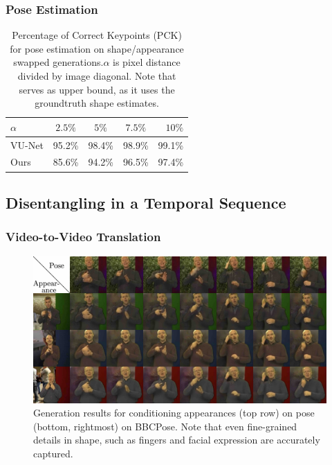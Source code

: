 		\begin{frame}[t]
		\frametitle{Pose Estimation}
			\begin{table}[htp]
				\centering
				\caption{Percentage of Correct Keypoints (PCK) for pose estimation on shape/appearance swapped generations.\;$\alpha$ is pixel distance divided by image diagonal. Note that \cite{esser18} serves as upper bound, as it uses the groundtruth shape estimates.}
				\label{tab:pose}
				\begin{tabular}{l|cccr}
					\hline
					$\alpha$ & $2.5\%$ &  $5\%$ & $7.5\%$ & $10\%$ \\ \hline
					VU-Net \cite{esser18} & {95.2}\% & {98.4}\% & {98.9}\% & {99.1}\% \\
					Ours & 85.6\% & 94.2\% &96.5\% & 97.4\% \\ \hline
				\end{tabular}
			\end{table}
		\end{frame}


	\subsection{Disentangling in a Temporal Sequence}
		\begin{frame}[t]
		\frametitle{Video-to-Video Translation}
			\begin{figure}[htp]
				\centering
				\includegraphics[trim={0cm 0cm 0cm 0cm},clip, width=1.\linewidth]{fig/factor/bbc_arrange}
				\caption{Generation results for conditioning appearances (top row) on pose (bottom, rightmost) on BBCPose.
				Note that even fine-grained details in shape, such as fingers and facial expression are accurately captured.}
				\label{fig:bbcthumb}
			\end{figure}
		\end{frame}

